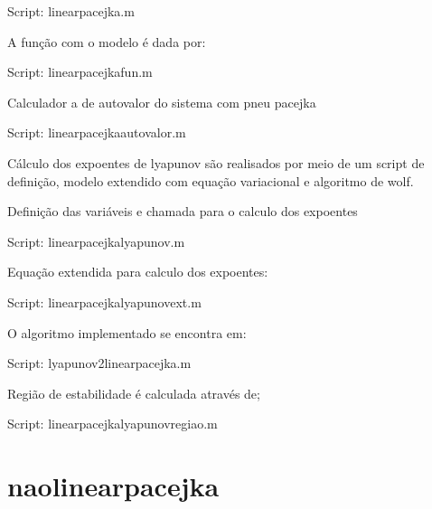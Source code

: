 \documentclass[sublist]{fei}
\begin{document}
	Script: linearpacejka.m

A função com o modelo é dada por:

	Script: linearpacejkafun.m

Calculador a de autovalor do sistema com pneu pacejka

	Script: linearpacejkaautovalor.m

Cálculo dos expoentes de lyapunov são realisados por meio de um script de definição, modelo extendido com equação variacional e algoritmo de wolf.

Definição das variáveis e chamada para o calculo dos expoentes

	Script: linearpacejkalyapunov.m

Equação extendida para calculo dos expoentes:

	Script: linearpacejkalyapunovext.m

O algoritmo implementado se encontra em:

Script: lyapunov2linearpacejka.m

Região de estabilidade é calculada através de;

	Script: linearpacejkalyapunovregiao.m








\chapter{naolinearpacejka} 







%
%

\end{document}

